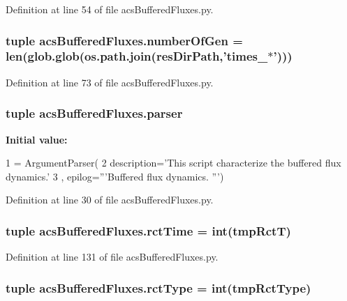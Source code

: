 Definition at line 54 of file acs\-Buffered\-Fluxes.\-py.

\hypertarget{a00092_acd3059fa3a61438f739193dc80f23b80}{
\subsubsection[{number\-Of\-Gen}]{\setlength{\rightskip}{0pt plus 5cm}tuple acs\-Buffered\-Fluxes.\-number\-Of\-Gen = len(glob.\-glob(os.\-path.\-join({\bf res\-Dir\-Path},'times\-\_\-$\ast$')))}}\label{a00092_acd3059fa3a61438f739193dc80f23b80}


Definition at line 73 of file acs\-Buffered\-Fluxes.\-py.

\hypertarget{a00092_adba84e3872cb47cad219837458e56677}{
\subsubsection[{parser}]{\setlength{\rightskip}{0pt plus 5cm}tuple acs\-Buffered\-Fluxes.\-parser}}\label{a00092_adba84e3872cb47cad219837458e56677}
{\bfseries Initial value\-:}
\begin{DoxyCode}
1 = ArgumentParser(
2                                 description=\textcolor{stringliteral}{'This script characterize the buffered flux dynamics.'}
3                                 , epilog=\textcolor{stringliteral}{'''Buffered flux dynamics. '''})
\end{DoxyCode}


Definition at line 30 of file acs\-Buffered\-Fluxes.\-py.

\hypertarget{a00092_a8bce447521fd3dec6adb8f7603f8ea4e}{
\subsubsection[{rct\-Time}]{\setlength{\rightskip}{0pt plus 5cm}tuple acs\-Buffered\-Fluxes.\-rct\-Time = int(tmp\-Rct\-T)}}\label{a00092_a8bce447521fd3dec6adb8f7603f8ea4e}


Definition at line 131 of file acs\-Buffered\-Fluxes.\-py.

\hypertarget{a00092_a154a987096ec19ec5944920f52003171}{
\subsubsection[{rct\-Type}]{\setlength{\rightskip}{0pt plus 5cm}tuple acs\-Buffered\-Fluxes.\-rct\-Type = int(tmp\-Rct\-Type)}}\label{a00092_a154a987096ec19ec5944920f52003171}


